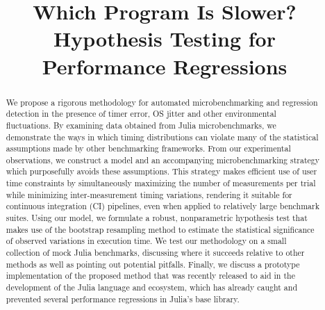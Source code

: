 \documentclass[conference]{IEEEtran}
\begin{document}
\newcommand{\TODO}[1]{\todo[inline]{#1}}
\newcommand{\TODOFIG}[1]{\missingfigure{#1}}

\title{Which Program Is Slower? Hypothesis Testing for Performance Regressions}

\author{
}

\maketitle

\begin{abstract}
We propose a rigorous methodology for automated microbenchmarking and regression detection
in the presence of timer error, OS jitter and other environmental fluctuations. By examining
data obtained from Julia microbenchmarks, we demonstrate the ways in which timing
distributions can violate many of the statistical assumptions made by other benchmarking
frameworks. From our experimental observations, we construct a model and an accompanying
microbenchmarking strategy which purposefully avoids these assumptions. This strategy makes
efficient use of user time constraints by simultaneously maximizing the number of
measurements per trial while minimizing inter-measurement timing variations, rendering it
suitable for continuous integration (CI) pipelines, even when applied to relatively large
benchmark suites. Using our model, we formulate a robust, nonparametric hypothesis test that
makes use of the bootstrap resampling method to estimate the statistical significance of
observed variations in execution time. We test our methodology on a small collection of mock
Julia benchmarks, discussing where it succeeds relative to other methods as well as pointing
out potential pitfalls. Finally, we discuss a prototype implementation of the proposed
method that was recently released to aid in the development of the Julia language and
ecosystem, which has already caught and prevented several performance regressions in Julia's
base library.
\end{abstract}
\end{document}
